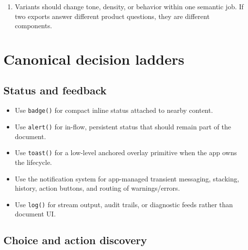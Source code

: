 \begin{enumerate}
\item
  Variants should change tone, density, or behavior within one semantic job. If two exports answer different product questions, they are different components.
\end{enumerate}

\section{Canonical decision ladders}\label{record-425-canonical-decision-ladders}

\subsection{Status and feedback}\label{record-425-status-and-feedback}

\begin{itemize}
\tightlist
\item
  Use \texttt{b\allowbreak{}a\allowbreak{}d\allowbreak{}g\allowbreak{}e\allowbreak{}(\allowbreak{})} for compact inline status attached to nearby content.
\item
  Use \texttt{a\allowbreak{}l\allowbreak{}e\allowbreak{}r\allowbreak{}t\allowbreak{}(\allowbreak{})} for in-flow, persistent status that should remain part of the document.
\item
  Use \texttt{t\allowbreak{}o\allowbreak{}a\allowbreak{}s\allowbreak{}t\allowbreak{}(\allowbreak{})} for a low-level anchored overlay primitive when the app owns the lifecycle.
\item
  Use the notification system for app-managed transient messaging, stacking, history, action buttons, and routing of warnings/errors.
\item
  Use \texttt{l\allowbreak{}o\allowbreak{}g\allowbreak{}(\allowbreak{})} for stream output, audit trails, or diagnostic feeds rather than document UI.
\end{itemize}

\subsection{Choice and action discovery}\label{record-425-choice-and-action-discovery}

